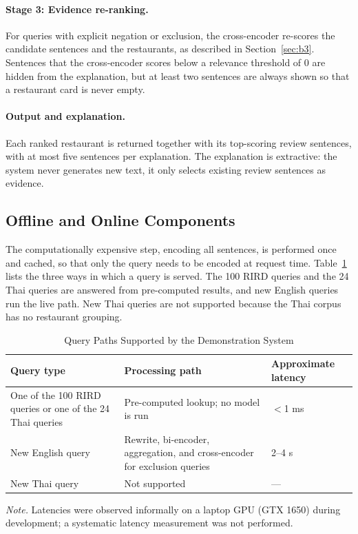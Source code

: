 \paragraph{Stage 3: Evidence re-ranking.} For queries with explicit negation or exclusion, the cross-encoder re-scores the candidate sentences and the restaurants, as described in Section~\ref{sec:b3}. Sentences that the cross-encoder scores below a relevance threshold of 0 are hidden from the explanation, but at least two sentences are always shown so that a restaurant card is never empty.

\paragraph{Output and explanation.} Each ranked restaurant is returned together with its top-scoring review sentences, with at most five sentences per explanation. The explanation is extractive: the system never generates new text, it only selects existing review sentences as evidence.

\subsection{Offline and Online Components}
\label{sec:offlineonline}

The computationally expensive step, encoding all sentences, is performed once and cached, so that only the query needs to be encoded at request time. Table~\ref{tab:querypaths} lists the three ways in which a query is served. The 100 RIRD queries and the 24 Thai queries are answered from pre-computed results, and new English queries run the live path. New Thai queries are not supported because the Thai corpus has no restaurant grouping.

\begin{table}[htbp]
\centering
\caption{Query Paths Supported by the Demonstration System}
\label{tab:querypaths}
\small
\begin{tabular}{|p{}|p{}|p{}|}
\hline
\textbf{Query type} & \textbf{Processing path} & \textbf{Approximate latency} \\
\hline
One of the 100 RIRD queries or one of the 24 Thai queries & Pre-computed lookup; no model is run & $<$1 ms \\
\hline
New English query & Rewrite, bi-encoder, aggregation, and cross-encoder for exclusion queries & 2--4 s \\
\hline
New Thai query & Not supported & --- \\
\hline
\end{tabular}

\vspace{2pt}
\footnotesize\textit{Note.} Latencies were observed informally on a laptop GPU (GTX 1650) during development; a systematic latency measurement was not performed.
\end{table}

